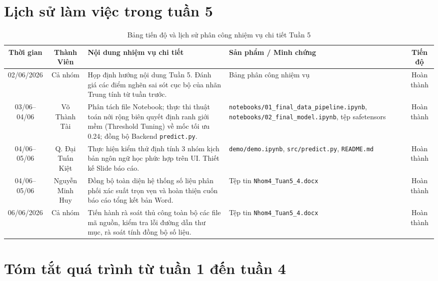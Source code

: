\documentclass[conference,10pt,a4paper]{IEEEtran}
\begin{document}
\section{Lịch sử làm việc trong tuần 5}


\begin{table}[t]
\centering
\caption{Bảng tiến độ và lịch sử phân công nhiệm vụ chi tiết Tuần 5}
\vspace{0.15cm}
\small
\renewcommand{\arraystretch}{1.3} 
\begin{tabularx}{\textwidth}{|c|c|X|p{4.2cm}|c|}
\hline
\textbf{Thời gian} & \textbf{Thành Viên} & \textbf{Nội dung nhiệm vụ chi tiết} & \textbf{Sản phẩm / Minh chứng} & \textbf{Tiến độ} \\
\hline
02/06/2026 & Cả nhóm & Họp định hướng nội dung Tuần 5. Đánh giá các điểm nghẽn sai sót cục bộ của nhãn Trung tính từ tuần trước. & Bảng phân công nhiệm vụ & Hoàn thành \\
\hline
03/06--04/06 & Võ Thành Tài & Phân tách file Notebook; thực thi thuật toán nới rộng biên quyết định ranh giới mềm (Threshold Tuning) về mốc tối ưu 0.24; đồng bộ Backend \texttt{predict.py}. & \texttt{notebooks/01\_final\_data\_}\newline\texttt{pipeline.ipynb}, \newline \texttt{notebooks/02\_final\_model.ipynb}, \newline tệp safetensors & Hoàn thành \\
\hline
04/06--05/06 & Q. Đại Tuấn Kiệt & Thực hiện kiểm thử định tính 3 nhóm kịch bản ngôn ngữ học phức hợp trên UI. Thiết kế Slide báo cáo. & \texttt{demo/demo.ipynb}, \newline \texttt{src/predict.py}, \newline \texttt{README.md} & Hoàn thành \\
\hline
04/06--05/06 & Nguyễn Minh Huy & Đồng bộ toàn diện hệ thống số liệu phân phối xác suất trọn vẹn và hoàn thiện cuốn báo cáo tổng kết bản Word. & Tệp tin \texttt{Nhom4\_Tuan5\_4.docx} & Hoàn thành \\
\hline
06/06/2026 & Cả nhóm & Tiến hành rà soát thủ công toàn bộ các file mã nguồn, kiểm tra lỗi đường dẫn thư mục, rà soát tính đồng bộ số liệu. & Tệp tin \texttt{Nhom4\_Tuan5\_4.docx} & Hoàn thành \\
\hline
\end{tabularx}
\end{table}

\section{Tóm tắt quá trình từ tuần 1 đến tuần 4}
\end{document}
